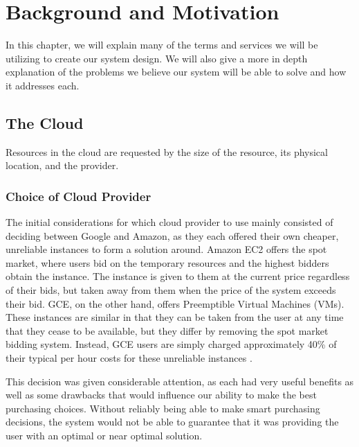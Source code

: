 \documentclass[thesis,proposal]{umassthesis}  %
\begin{document}
\chapter{Background and Motivation}

In this chapter, we will explain many of the terms and services we will be utilizing to create our system design. We will also give a more in depth explanation of the problems we believe our system will be able to solve and how it addresses each.

\section{The Cloud}

Resources in the cloud are requested by the size of the resource, its physical location, and the provider. 

\subsection{Choice of Cloud Provider}

The initial considerations for which cloud provider to use mainly consisted of deciding between Google and Amazon, as they each offered their own cheaper, unreliable instances to form a solution around. Amazon EC2 offers the spot market, where users bid on the temporary resources and the highest bidders obtain the instance. The instance is given to them at the current price regardless of their bids, but taken away from them when the price of the system exceeds their bid. GCE, on the other hand, offers Preemptible Virtual Machines (VMs). These instances are similar in that they can be taken from the user at any time that they cease to be available, but they differ by removing the spot market bidding system. Instead, GCE users are simply charged approximately 40\% of their typical per hour costs for these unreliable instances \cite{googleComputePricing}. \par

This decision was given considerable attention, as each had very useful benefits as well as some drawbacks that would influence our ability to make the best purchasing choices. Without reliably being able to make smart purchasing decisions, the system would not be able to guarantee that it was providing the user with an optimal or near optimal solution.\par
\end{document}
